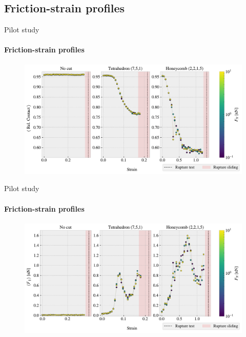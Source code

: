 \documentclass[
	10pt, %
]{beamer}
\begin{document}
\subsection{Friction-strain profiles}
\begin{frame}{Pilot study}
	\framesubtitle{Friction-strain profiles}

	\begin{figure}[H]
		\centering
		\includegraphics[width=1\linewidth]{../thesis/figures/baseline/multi_stretch_area_compare.pdf}
	\end{figure}
\end{frame}
%
%
\begin{frame}{Pilot study}
	\framesubtitle{Friction-strain profiles}

	\begin{figure}[H]
		\centering
		\includegraphics[width=1\linewidth]{../thesis/figures/baseline/multi_stretch_mean_compare.pdf}
	\end{figure}
\end{frame}
%
%
\end{document}
